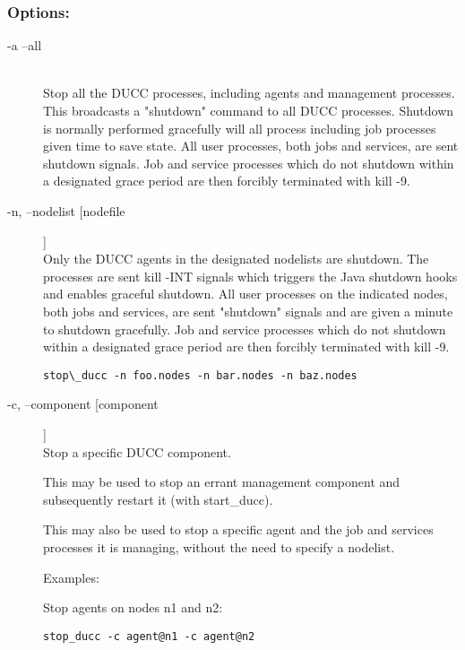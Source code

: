       \subsubsection{Options:}
        \begin{description}

          \item[-a --all] \hfill \\
            Stop all the DUCC processes, including agents and management processes. This 
            broadcasts a "shutdown" command to all DUCC processes. Shutdown is normally 
            performed gracefully will all process including job processes given time to save state. 
            All user processes, both jobs and services, are sent shutdown signals. Job and service 
            processes which do not shutdown within a designated grace period are then forcibly 
            terminated with kill -9. 
            
          \item[-n, --nodelist [nodefile]] \hfill \\
            Only the DUCC agents in the designated nodelists are shutdown. The processes are sent 
            kill -INT signals which triggers the Java shutdown hooks and enables graceful shutdown. 
            All user processes on the indicated nodes, both jobs and services, are sent "shutdown" 
            signals and are given a minute to shutdown gracefully. Job and service processes which do 
            not shutdown within a designated grace period are then forcibly terminated with kill -9. 
            
\begin{verbatim}
stop\_ducc -n foo.nodes -n bar.nodes -n baz.nodes 
\end{verbatim}

          \item[-c, --component [component]] \hfill \\
            Stop a specific DUCC component. 

            This may be used to stop an errant management component and subsequently restart it 
            (with start\_ducc). 
            
            This may also be used to stop a specific agent and the job and services processes it is
            managing, without the need to specify a nodelist.  
            
            Examples: 

            Stop agents on nodes n1 and n2:
\begin{verbatim}
stop_ducc -c agent@n1 -c agent@n2 
\end{verbatim}
            

\end{description}
